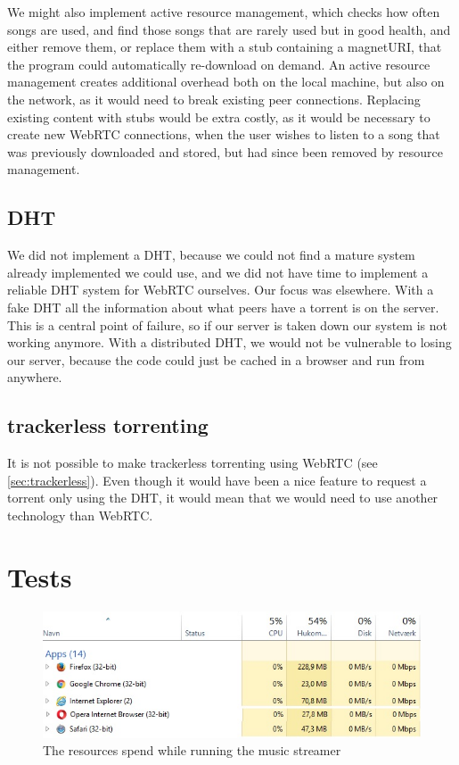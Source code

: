 We might also implement active resource management, which checks how often songs are used,
and find those songs that are rarely used but in good health, and either remove them,
or replace them with a stub containing a magnetURI, 
that the program could automatically re-download on demand.
An active resource management creates additional overhead both on the local machine,
but also on the network, as it would need to break existing peer connections.
Replacing existing content with stubs would be extra costly,
as it would be necessary to create new WebRTC connections,
when the user wishes to listen to a song that was previously downloaded and stored,
but had since been removed by resource management.

\subsection{DHT}
We did not implement a DHT, 
because we could not find a mature system already implemented we could use, 
and we did not have time to implement a reliable DHT system for WebRTC ourselves.
Our focus was elsewhere.
With a fake \acs{DHT} all the information about what peers have a torrent is on the server. 
This is a central point of failure, so if our server is taken down our system is not working anymore.
With a distributed \acs{DHT}, 
we would not be vulnerable to losing our server, 
because the code could just be cached in a browser and run from anywhere.

\subsection{trackerless torrenting}
It is not possible to make trackerless torrenting using WebRTC (see \ref{sec:trackerless}). 
Even though it would have been a nice feature to request a torrent only using the \acs{DHT},
it would mean that we would need to use another technology than WebRTC.

\section{Tests}
\begin{figure}[H]
	\centering
	\includegraphics[width=\linewidth]{gfx/streamerIdle}
	\caption{The resources spend while running the music streamer}
	\label{fig:streamer-idle}
\end{figure}

